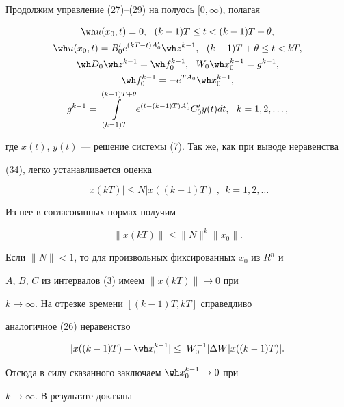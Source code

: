 Продолжим управление (27)--(29) на полуось $[0, \infty)$, полагая


\begin{gather}


\wh u(x_0,t)= 0, \ \ (k-1)T \le t < (k-1)T+\theta,\notag\\


\wh u(x_0,t)= B_0'e^{(kT-t)A_0'} \wh z^{k-1}, \ \ 


(k-1)T+\theta \le t < kT,\notag\\


\wh D_0 \wh z^{k-1} = \wh f_0^{k-1}, \ \


W_0 \wh x_0^{k-1} = g^{k-1}, \\


\wh f_0^{k-1} = - e^{TA_0} \wh x_0^{k-1},\notag \\


g^{k-1}= \int\limits_{(k-1)T}^{(k-1)T+\theta}


e^{(t-(k-1)T) A_0'} C_0' y(t) dt,\ \ k=1,2,\dotsc,\notag


\end{gather}


где $x(t)$, $y(t)$ --- решение системы (7). Так же, как при выводе неравенства


(34), легко устанавливается оценка


$$


|x(kT)| \le N |x((k-1)T)|, \ \ k=1,2,\dotsc


$$


Из нее в согласованных нормах получим


$$


\|x(kT) \| \le \|N\|^k \|x_0\|.


$$





Если $\|N\| < 1$, то для произвольных фиксированных $x_0$ из $R^n$ и


$A$, $B$, $C$ из интервалов (3) имеем $\|x(kT)\| \rightarrow 0$ при


$k \rightarrow \infty$. На отрезке времени $[(k-1)T, kT]$ справедливо


аналогичное (26) неравенство


$$


|x((k-1)T) - \wh x_0^{k-1}| \le |W_0^{-1}| \Delta W |x((k-1)T)|.


$$


Отсюда в силу сказанного заключаем $\wh x_0^{k-1} \rightarrow 0$ при


$k \rightarrow \infty$. В результате доказана


